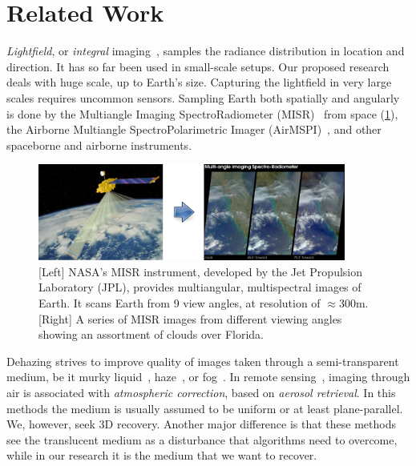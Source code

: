 \documentclass[10pt,letterpaper]{article}
\begin{document}

\section{Related Work}
\label{sec:literature}

{\em Lightfield}, or {\em integral}
imaging~\cite{Ng2006,bishop,Ng1948}, samples the radiance distribution
in location and direction. It has so far been used in small-scale
setups. Our proposed research deals with huge scale, up to Earth's
size. Capturing the lightfield in very large scales requires uncommon
sensors. Sampling Earth both spatially and angularly is done by the
Multiangle Imaging SpectroRadiometer (MISR)~\cite{Martonchikc} from
space (\cref{fig:misr}), the Airborne Multiangle SpectroPolarimetric
Imager (AirMSPI)~\cite{dinerDavis10}, and other spaceborne and
airborne instruments.
\begin{figure}[t]
  \centering
  \includegraphics[width=0.90\textwidth]{misr.pdf}
  \caption{\small{[Left] NASA's MISR instrument, developed by the Jet
      Propulsion Laboratory (JPL), provides multiangular,
      multispectral images of Earth.  It scans Earth from 9 view
      angles, at resolution of $\approx 300$m.  [Right] A series of
      MISR images from different viewing angles showing an assortment
      of clouds over Florida.}  }
  \label{fig:misr}
\end{figure}

Dehazing strives to improve quality of images taken through a
semi-transparent medium, be it murky liquid~\cite{kim,fuchs},
haze~\cite{fattal,Hschechner2}, or fog~\cite{narasimhan2}.  In remote
sensing~\cite{kokhan}, imaging through air is associated with {\em
  atmospheric correction}, based on {\em aerosol retrieval}.  In this
methods the medium is usually assumed to be uniform or at least
plane-parallel.  We, however, seek 3D recovery.  Another major
difference is that these methods see the translucent medium as a
disturbance that algorithms need to overcome, while in our research it
is the medium that we want to recover.
\end{document}
